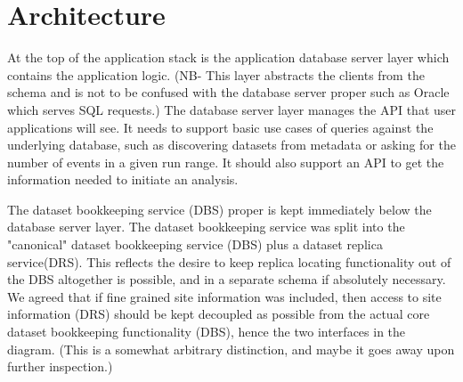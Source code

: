 \documentclass{cmspaper}
\begin{document}
\section{Architecture}


At the top of the application stack is the application database server layer which contains
the application logic.  (NB- This layer abstracts the clients from the schema and is not 
to be confused with the database server proper such as Oracle which serves SQL requests.) 
The database server layer manages the API that user applications will see.  It needs to 
support basic use cases of queries against the underlying database, such as discovering 
datasets from metadata or asking for the number of events in a given run range.  It 
should also support an API to get the information needed to initiate an analysis.  

The dataset bookkeeping service (DBS) proper is kept immediately below the database 
server layer.  The dataset bookkeeping service was split into the "canonical" dataset 
bookkeeping service (DBS) plus a dataset replica service(DRS).  This reflects the 
desire to keep replica locating functionality out of the DBS altogether is possible, 
and in a separate schema if absolutely necessary.    We agreed that if fine grained 
site information was included, then access to site information (DRS) should be kept 
decoupled as possible from the actual core dataset bookkeeping functionality (DBS), 
hence the two interfaces in the diagram.  (This is a somewhat arbitrary distinction, 
and maybe it goes away upon further inspection.)
\end{document}
